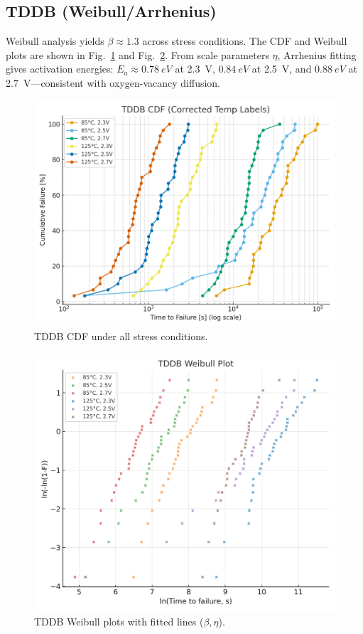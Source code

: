 \documentclass[conference]{IEEEtran}
\begin{document}
\subsection{TDDB (Weibull/Arrhenius)}
Weibull analysis yields \(\beta \approx 1.3\) across stress conditions.  
The CDF and Weibull plots are shown in Fig.~\ref{fig:tddb_cdf} and Fig.~\ref{fig:tddb_weibull}.  
From scale parameters \(\eta\), Arrhenius fitting gives activation energies:
\(E_a\approx\SI{0.78}{eV}\) at 2.3~V, \(\SI{0.84}{eV}\) at 2.5~V, and \(\SI{0.88}{eV}\) at 2.7~V---consistent with oxygen-vacancy diffusion.
\begin{figure}[t]\centering
  \includegraphics[width=\linewidth]{fig4_tddb_cdf.png}
  \caption{TDDB CDF under all stress conditions.}
  \label{fig:tddb_cdf}
\end{figure}
\begin{figure}[t]\centering
  \includegraphics[width=\linewidth]{fig4_tddb_weibull.png}
  \caption{TDDB Weibull plots with fitted lines (\(\beta,\eta\)).}
  \label{fig:tddb_weibull}
\end{figure}
\end{document}
